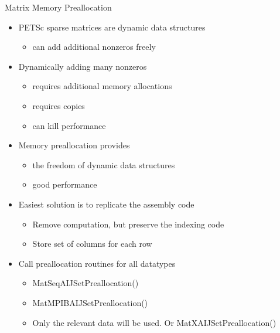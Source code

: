 \begin{frame}{Matrix Memory Preallocation}
\begin{itemize}
  \item PETSc sparse matrices are dynamic data structures
  \begin{itemize}
    \item can add additional nonzeros freely
  \end{itemize}

  \item Dynamically adding many nonzeros 
  \begin{itemize}
    \item requires additional memory allocations
    \item requires copies
    \item can kill performance
  \end{itemize}

  \item Memory preallocation provides
  \begin{itemize}
    \item the freedom of dynamic data structures
    \item good performance
  \end{itemize}

  \item Easiest solution is to replicate the assembly code
  \begin{itemize}
    \item Remove computation, but preserve the indexing code
    \item Store set of columns for each row
  \end{itemize}

  \item Call preallocation routines for all datatypes
  \begin{itemize}
    \item {\kb MatSeqAIJSetPreallocation()}
    \item {\kb MatMPIBAIJSetPreallocation()}
    \item Only the relevant data will be used.  Or {\kb MatXAIJSetPreallocation()}
  \end{itemize}
\end{itemize}
\end{frame}


